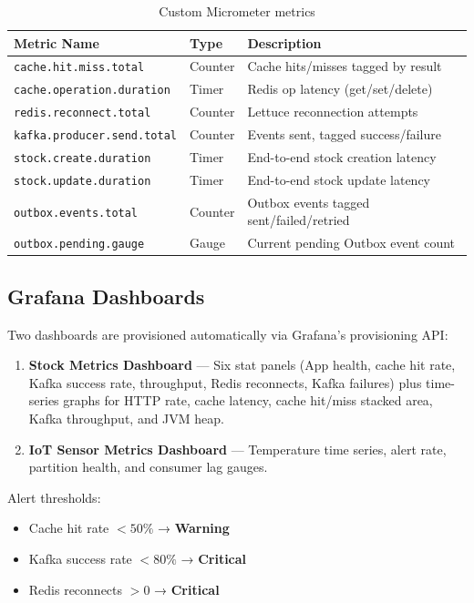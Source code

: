 \documentclass[12pt,a4paper,twoside]{article}
\begin{document}
\begin{table}[H]
\centering
\caption{Custom Micrometer metrics}
\label{tab:metrics}
\begin{tabularx}{\textwidth}{@{}llX@{}}
\toprule
\textbf{Metric Name}              & \textbf{Type}   & \textbf{Description} \\
\midrule
\texttt{cache.hit.miss.total}     & Counter  & Cache hits/misses tagged by result \\
\texttt{cache.operation.duration} & Timer    & Redis op latency (get/set/delete) \\
\texttt{redis.reconnect.total}    & Counter  & Lettuce reconnection attempts \\
\texttt{kafka.producer.send.total}& Counter  & Events sent, tagged success/failure \\
\texttt{stock.create.duration}    & Timer    & End-to-end stock creation latency \\
\texttt{stock.update.duration}    & Timer    & End-to-end stock update latency \\
\texttt{outbox.events.total}      & Counter  & Outbox events tagged sent/failed/retried \\
\texttt{outbox.pending.gauge}     & Gauge    & Current pending Outbox event count \\
\bottomrule
\end{tabularx}
\end{table}

\subsection{Grafana Dashboards}

Two dashboards are provisioned automatically via Grafana's provisioning
API:

\begin{enumerate}
  \item \textbf{Stock Metrics Dashboard} — Six stat panels (App health,
        cache hit rate, Kafka success rate, throughput, Redis reconnects,
        Kafka failures) plus time-series graphs for HTTP rate, cache
        latency, cache hit/miss stacked area, Kafka throughput, and
        JVM heap.

  \item \textbf{IoT Sensor Metrics Dashboard} — Temperature time series,
        alert rate, partition health, and consumer lag gauges.
\end{enumerate}

Alert thresholds:
\begin{itemize}[noitemsep]
  \item Cache hit rate $< 50\%$ → \textcolor{warning}{\textbf{Warning}}
  \item Kafka success rate $< 80\%$ → \textcolor{danger}{\textbf{Critical}}
  \item Redis reconnects $> 0$ → \textcolor{danger}{\textbf{Critical}}
\end{itemize}
\end{document}
